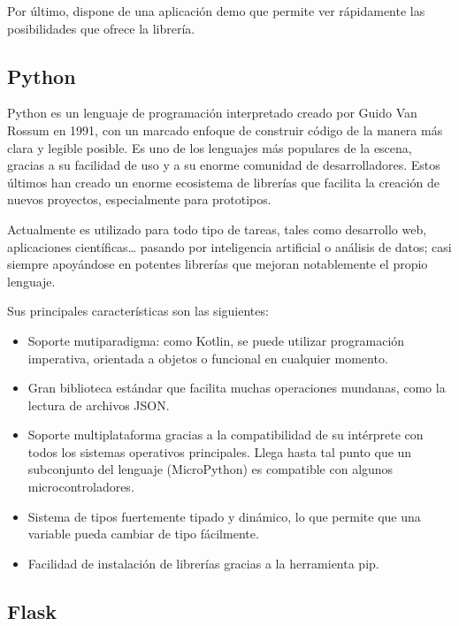            Por último, dispone de una aplicación demo que permite ver rápidamente las posibilidades que ofrece la 
            librería.
    
        \subsection{Python}
            Python es un lenguaje de programación interpretado creado por Guido Van Rossum en 1991, con un marcado enfoque 
            de construir código de la manera más clara y legible posible. Es uno de los lenguajes más populares de la 
            escena, gracias a su facilidad de uso y a su enorme comunidad de desarrolladores. Estos últimos han creado un 
            enorme ecosistema de librerías que facilita la creación de nuevos proyectos, especialmente para prototipos.

            Actualmente es utilizado para todo tipo de tareas, tales como desarrollo web, aplicaciones científicas… 
            pasando por inteligencia artificial o análisis de datos; casi siempre apoyándose en potentes librerías 
            que mejoran notablemente el propio lenguaje. 

            Sus principales características son las siguientes:
            \begin{itemize}
                \item Soporte mutiparadigma: como Kotlin, se puede utilizar programación imperativa, orientada a objetos o 
                funcional en cualquier momento.
                \item Gran biblioteca estándar que facilita muchas operaciones mundanas, como la lectura de archivos JSON.
                \item Soporte multiplataforma gracias a la compatibilidad de su intérprete con todos los sistemas 
                operativos principales. Llega hasta tal punto que un subconjunto del lenguaje (MicroPython) es compatible 
                con algunos microcontroladores.
                \item Sistema de tipos fuertemente tipado y dinámico, lo que permite que una variable pueda cambiar de 
                tipo fácilmente.
                \item Facilidad de instalación de librerías gracias a la herramienta pip.
            \end{itemize}
        
        \subsection{Flask}

